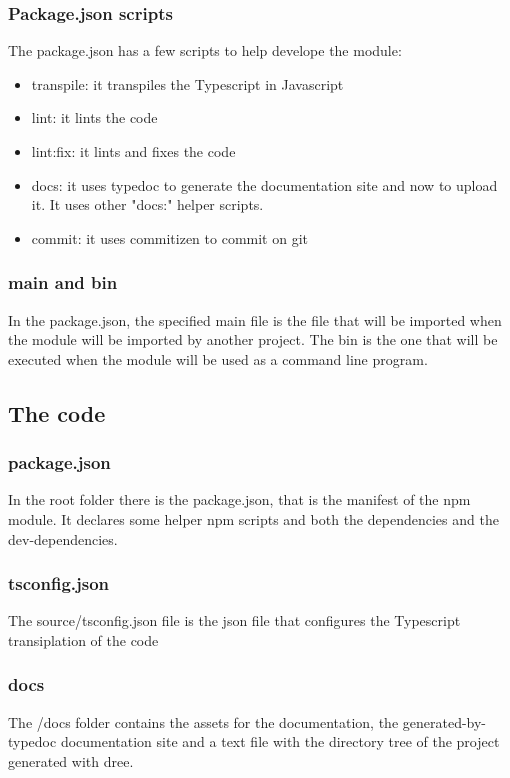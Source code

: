 \subsubsection{Package.json scripts}
The package.json has a few scripts to help develope the module:

\begin{itemize}
    \item transpile: it transpiles the Typescript in Javascript
    \item lint: it lints the code
    \item lint:fix: it lints and fixes the code
    \item docs: it uses typedoc to generate the documentation site and now to upload it. It uses other "docs:" helper scripts.
    \item commit: it uses commitizen to commit on git
\end{itemize}

\subsubsection{main and bin}
In the package.json, the specified main file is the file that will be imported when the module will be imported by another project.
The bin is the one that will be executed when the module will be used as a command line program.

\subsection{The code}

\subsubsection{package.json}
In the root folder there is the package.json, that is the manifest of the npm module. It declares some helper npm scripts and both the dependencies 
and the dev-dependencies.

\subsubsection{tsconfig.json}
The source/tsconfig.json file is the json file that configures the Typescript transiplation of the code

\subsubsection{docs}
The /docs folder contains the assets for the documentation, the generated-by-typedoc documentation site and a text file with the directory tree of
the project generated with dree.

